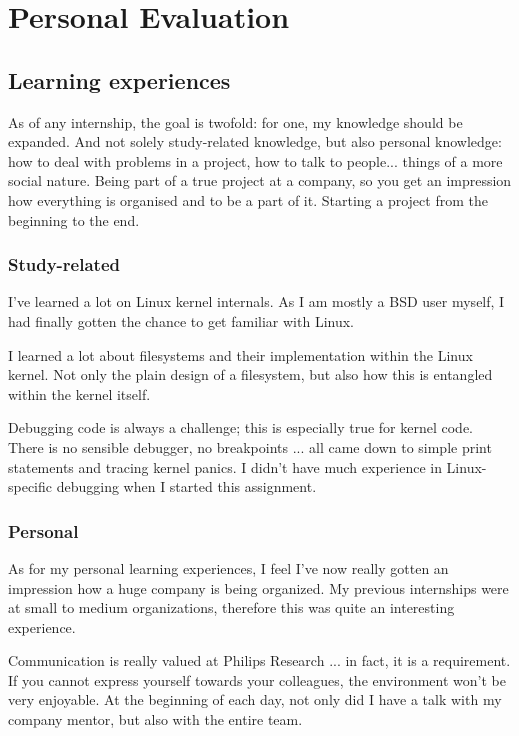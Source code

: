 \chapter{Personal Evaluation}

\section{Learning experiences}

As of any internship, the goal is twofold: for one, my knowledge should be expanded. And not solely study-related knowledge, but also personal knowledge: how to deal with problems in a project, how to talk to people... things of a more social nature. Being part of a true project at a company, so you get an impression how everything is organised and to be a part of it. Starting a project from the beginning to the end.

\subsection{Study-related}

I've learned a lot on Linux kernel internals. As I am mostly a BSD user myself, I had finally gotten the chance to get familiar with Linux.

I learned a lot about filesystems and their implementation within the Linux kernel. Not only the plain design of a filesystem, but also how this is entangled within the kernel itself.

Debugging code is always a challenge; this is especially true for kernel code. There is no sensible debugger, no breakpoints ... all came down to simple print statements and tracing kernel panics. I didn't have much experience in Linux-specific debugging when I started this assignment.

\subsection{Personal}

As for my personal learning experiences, I feel I've now really gotten an impression how a huge company is being organized. My previous internships were at small to medium organizations, therefore this was quite an interesting experience.

Communication is really valued at Philips Research ... in fact, it is a requirement. If you cannot express yourself towards your colleagues, the environment won't be very enjoyable. At the beginning of each day, not only did I have a talk with my company mentor, but also with the entire team.

